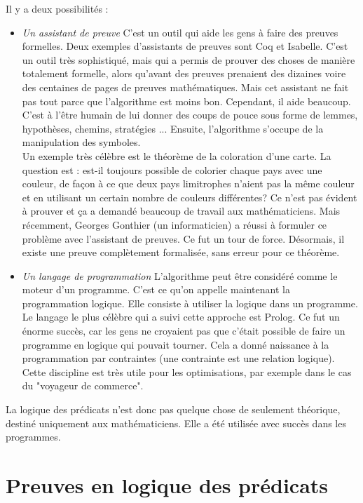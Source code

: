 Il y a deux possibilités : 
\begin{itemize}
\item {\em Un assistant de preuve}
C'est un outil qui aide les gens à faire des preuves formelles. Deux exemples d'assistants de preuves sont Coq et Isabelle. C'est un outil très sophistiqué, mais qui a permis de prouver des choses de manière totalement formelle, alors qu'avant des preuves prenaient des dizaines voire des centaines de pages de preuves mathématiques. Mais cet assistant ne fait pas tout parce que l'algorithme est moins bon. Cependant, il aide beaucoup. C'est à l'être humain de lui donner des coups de pouce sous forme de lemmes, hypothèses, chemins, stratégies ... Ensuite, l'algorithme s'occupe de la manipulation des symboles.\\
Un exemple très célèbre est le théorème de la coloration d'une carte. La question est : est-il toujours possible de colorier chaque pays avec une couleur, de façon à ce que deux pays limitrophes n'aient pas la même couleur et en utilisant un certain nombre de couleurs différentes? Ce n'est pas évident à prouver et ça a demandé beaucoup de travail aux mathématiciens. Mais récemment, Georges Gonthier (un informaticien) a réussi à formuler ce problème avec l'assistant de preuves. Ce fut un tour de force. Désormais, il existe une preuve complètement formalisée, sans erreur pour ce théorème.
\item {\em Un langage de programmation}
L'algorithme peut être considéré comme le moteur d'un programme. C'est ce qu'on appelle maintenant la programmation logique. Elle consiste à utiliser la logique dans un programme. Le langage le plus célèbre qui a suivi cette approche est Prolog. Ce fut un énorme succès, car les gens ne croyaient pas que c'était possible de faire un programme en logique qui pouvait tourner. Cela a donné naissance à la programmation par contraintes (une contrainte est une relation logique). Cette discipline est très utile pour les optimisations, par exemple dans le cas du "voyageur de commerce".
\end{itemize}

La logique des prédicats n'est donc pas quelque chose de seulement théorique, destiné uniquement aux mathématiciens.
Elle a été utilisée avec succès dans les programmes.


\chapter{Preuves en logique des prédicats}
\label{preuvemanuelle}

